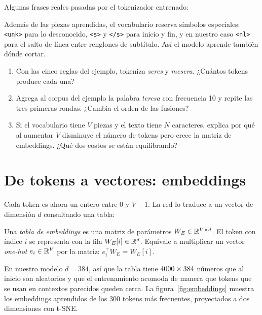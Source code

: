 \documentclass[11pt,letterpaper,oneside]{report}
\begin{document}
Algunas frases reales pasadas por el tokenizador entrenado:


\begin{nota}
Además de las piezas aprendidas, el vocabulario reserva símbolos especiales: \texttt{<unk>} para lo desconocido, \texttt{<s>} y \texttt{</s>} para inicio y fin, y en nuestro caso \texttt{<nl>} para el salto de línea entre renglones de subtítulo. Así el modelo aprende también dónde cortar.
\end{nota}

\begin{ejercicio}
\begin{enumerate}[label=\alph*)]
  \item Con las cinco reglas del ejemplo, tokeniza \emph{seres} y \emph{mesera}. ¿Cuántos tokens produce cada una?
  \item Agrega al corpus del ejemplo la palabra \emph{teresa} con frecuencia 10 y repite las tres primeras rondas. ¿Cambia el orden de las fusiones?
  \item Si el vocabulario tiene $V$ piezas y el texto tiene $N$ caracteres, explica por qué al aumentar $V$ disminuye el número de tokens pero crece la matriz de embeddings. ¿Qué dos costos se están equilibrando?
\end{enumerate}
\end{ejercicio}

\section{De tokens a vectores: embeddings}\label{sec:emb}

Cada token es ahora un entero entre $0$ y $V-1$. La red lo traduce a un vector de dimensión $d$ consultando una tabla:

\begin{definicion}
Una \emph{tabla de embeddings} es una matriz de parámetros $W_E \in \mathbb{R}^{V\times d}$. El token con índice $i$ se representa con la fila $W_E[i] \in \mathbb{R}^d$. Equivale a multiplicar un vector \emph{one-hot} $e_i \in \mathbb{R}^V$ por la matriz: $e_i^\top W_E = W_E[i]$.
\end{definicion}

En nuestro modelo $d = 384$, así que la tabla tiene $4000 \times 384$ números que al inicio son aleatorios y que el entrenamiento acomoda de manera que tokens que se usan en contextos parecidos queden cerca. La figura~\ref{fig:embeddings} muestra los embeddings aprendidos de los 300 tokens más frecuentes, proyectados a dos dimensiones con t-SNE.
\end{document}
